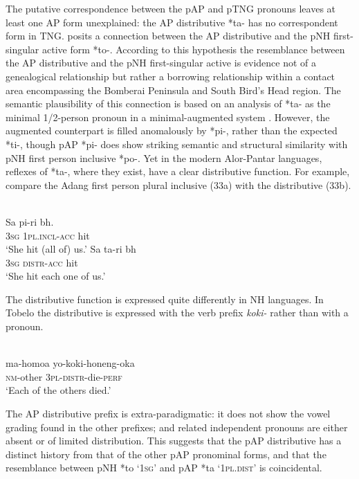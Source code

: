 The putative correspondence between the pAP and pTNG pronouns leaves at least one AP form unexplained: the AP distributive *ta- has no correspondent form in TNG. \citet{Donohue2008boundpron} posits a connection between the AP distributive and the pNH first-singular active form *to-. According to this hypothesis the resemblance between the AP distributive and the pNH first-singular active is evidence not of a genealogical relationship but rather a borrowing relationship within a contact area encompassing the Bomberai Peninsula and South Bird's Head region. The semantic plausibility of this connection is based on an analysis of *ta- as the minimal 1/2-person pronoun in a minimal-augmented system \citep{Donohue2007phonological}. However, the augmented counterpart is filled anomalously by *pi-, rather than the expected *ti-, though pAP *pi- does show striking semantic and structural similarity with pNH first person inclusive *po-. Yet in the modern Alor-Pantar languages, reflexes of *ta-, where they exist, have a clear distributive
function. For example, compare the Adang first person plural inclusive (33a) with the distributive (33b).


\ea%
\label{ex:4:33}
 \\
\ea
\gll Sa pi-ri b{\textepsilon}h. \\
    \textsc{3sg} \textsc{1pl.incl-acc} hit \\
\glt `She hit (all of) us.' 
  \ex 
  \gll Sa ta-ri b{\textepsilon}h \\
  \textsc{3sg} \textsc{distr-acc} hit \\
\glt `She hit each one of us.'
  \z
\z

The distributive function is expressed quite differently in NH languages. In Tobelo the distributive is expressed with the verb prefix \textit{koki-}  rather than with a pronoun.


\ea%
\label{ex:4:34}
 \\
\gll  ma-homoa yo-koki-honeng-oka  \\
   \textsc{nm}-other \textsc{3pl-distr}-die-\textsc{perf} \\
\glt `Each of the others died.'
\z





The AP distributive prefix is extra-paradigmatic: it does not show the vowel grading found in the other prefixes; and  related independent pronouns are either absent or of limited distribution. This suggests that the pAP distributive has a distinct history from that of the other pAP pronominal forms, and that the resemblance between pNH *to `\textsc{1sg}' and pAP *ta `\textsc{1pl.dist}' is coincidental.

